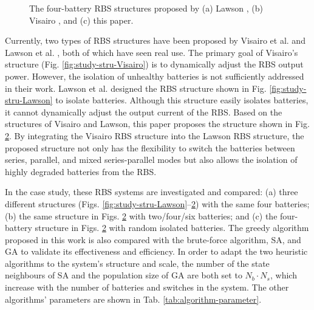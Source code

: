 \documentclass{article}
\begin{document}
\begin{figure}[htbp]
\begin{subfigure}[b]{0.31\textwidth}
        \caption{}
        \label{fig:study-stru-my}
    \end{subfigure}
    \caption{The four-battery RBS structures proposed by (a) Lawson \cite{lawsonSoftwareConfigurableBattery2012}, (b) Visairo \cite{visairoReconfigurableBatteryPack2008}, and (c) this paper.}
\end{figure}

Currently, two types of RBS structures have been proposed by Visairo et al. \cite{visairoReconfigurableBatteryPack2008} and Lawson et al. \cite{lawsonSoftwareConfigurableBattery2012}, both of which have seen real use. 
The primary goal of Visairo's structure (Fig. \ref{fig:study-stru-Visairo}) is to dynamically adjust the RBS output power. However, the isolation of unhealthy batteries is not sufficiently addressed in their work. 
Lawson et al. designed the RBS structure shown in Fig. \ref{fig:study-stru-Lawson} to isolate batteries. 
Although this structure easily isolates batteries, it cannot dynamically adjust the output current of the RBS. 
Based on the structures of Visairo and Lawson, this paper proposes the structure shown in Fig. \ref{fig:study-stru-my}.
By integrating the Visairo RBS structure into the Lawson RBS structure, the proposed structure not only has the flexibility to switch the batteries between series, parallel, and mixed series-parallel modes but also allows the isolation of highly degraded batteries from the RBS.


In the case study, these RBS systems are investigated and compared: (a) three different structures (Figs. \ref{fig:study-stru-Lawson}--\ref{fig:study-stru-my}) with the same four batteries; (b) the same structure in Figs. \ref{fig:study-stru-my} with two/four/six batteries; and (c) the four-battery structure in Figs. \ref{fig:study-stru-my} with random isolated batteries. 
The greedy algorithm proposed in this work is also compared with the brute-force algorithm, SA, and GA to validate its effectiveness and efficiency.
In order to adapt the two heuristic algorithms to the system's structure and scale, the number of the state neighbours of SA and the population size of GA are both set to $N_b \cdot N_s$, which increase with the number of batteries and switches in the system. 
The other algorithms' parameters are shown in Tab. \ref{tab:algorithm-parameter}.
\end{document}
